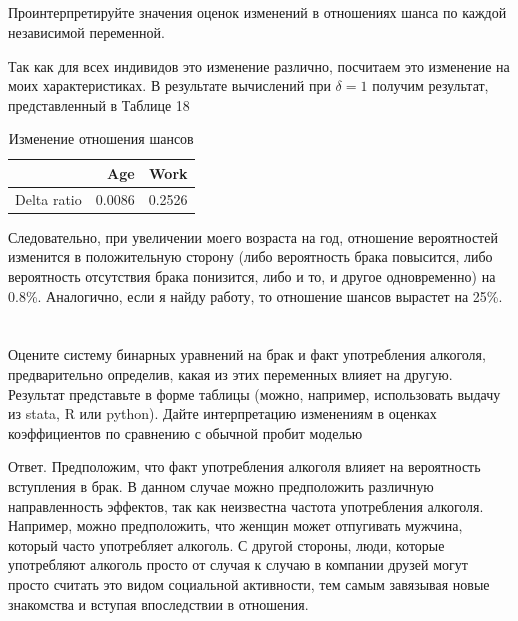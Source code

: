 \documentclass[a4paper,12pt]{article}
\begin{document}
\subsection{}
\Sun  Проинтерпретируйте значения оценок изменений в отношениях шанса по
каждой независимой переменной.

Так как для всех индивидов это изменение различно, посчитаем это изменение на моих характеристиках. В результате вычислений при $ \delta = 1$ получим результат, представленный в Таблице 18 
\begin{table}[ht]
	\centering
	\begin{tabular}{|rrr|}
		\hline
		& Age & Work \\ 
		\hline
		Delta ratio & 0.0086 & 0.2526 \\ 
		\hline
	\end{tabular}
\caption{Изменение отношения шансов}
\end{table}

Следовательно, при увеличении моего возраста на год, отношение вероятностей изменится в положительную сторону (либо вероятность брака повысится, либо вероятность отсутствия брака понизится, либо и то, и другое одновременно) на 0.8\%. Аналогично, если я найду работу, то отношение шансов вырастет на 25\%.
\section{}

\subsection{}

\Sun  Оцените систему бинарных уравнений на брак и факт употребления алкоголя,
предварительно определив, какая из этих переменных влияет на другую. Результат
представьте в форме таблицы (можно, например, использовать выдачу из stata, R или
python). Дайте интерпретацию изменениям в оценках коэффициентов по сравнению с
обычной пробит моделью


Ответ. Предположим, что факт употребления алкоголя влияет на вероятность вступления в брак. В данном случае можно предположить различную направленность эффектов, так как неизвестна частота употребления алкоголя. Например, можно предположить, что женщин может отпугивать мужчина, который часто употребляет алкоголь. С другой стороны, люди, которые употребляют алкоголь просто от случая к случаю в компании друзей могут просто считать это видом социальной активности, тем самым завязывая новые знакомства и вступая впоследствии в отношения.
\end{document}
